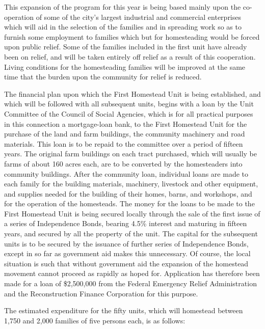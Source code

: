 \documentclass{book}
\begin{document}
This expansion of the program for this year is being based mainly upon the co-operation of some of the city’s largest industrial and commercial enterprises which will aid in the selection of the families and in spreading work so as to furnish some employment to families which but for homesteading would be forced upon public relief. Some of the families included in the first unit have already been on relief, and will be taken entirely off relief as a result of this cooperation. Living conditions for the homesteading families will be improved at the same time that the burden upon the community for relief is reduced.

The financial plan upon which the First Homestead Unit is being established, and which will be followed with all subsequent units, begins with a loan by the Unit Committee of the Council of Social Agencies, which is for all practical purposes in this connection a mortgage-loan bank, to the First Homestead Unit for the purchase of the land and farm buildings, the community machinery and road materials. This loan is to be repaid to the committee over a period of fifteen years. The original farm buildings on each tract purchased, which will usually be farms of about 160 acres each, are to be converted by the homesteaders into community buildings. After the community loan, individual loans are made to each family for the building materials, machinery, livestock and other equipment, and supplies needed for the building of their homes, barns, and workshops, and for the operation of the homesteads. The money for the loans to be made to the First Homestead Unit is being secured locally through the sale of the first issue of a series of Independence Bonds, bearing 4.5\% interest and maturing in fifteen years, and secured by all the property of the unit. The capital for the subsequent units is to be secured by the issuance of further series of Independence Bonds, except in so far as government aid makes this unnecessary. Of course, the local situation is such that without government aid the expansion of the homestead movement cannot proceed as rapidly as hoped for. Application has therefore been made for a loan of \$2,500,000 from the Federal Emergency Relief Administration and the Reconstruction Finance Corporation for this purpose.

The estimated expenditure for the fifty units, which will homestead between 1,750 and 2,000 families of five persons each, is as follows:
\end{document}

